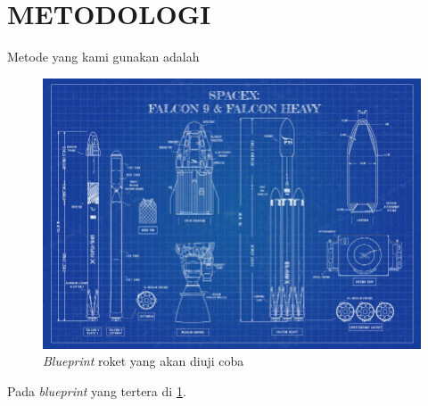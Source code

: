 \section{METODOLOGI}

Metode yang kami gunakan adalah \lipsum[10]

\begin{figure} [ht] \centering
  \includegraphics[scale=0.45]{gambar/blueprint.jpg}
  \caption{\emph{Blueprint} roket yang akan diuji coba}
  \label{fig:Blueprint}
\end{figure}

Pada \emph{blueprint} yang tertera di \ref{fig:Blueprint}. \lipsum[11]

\lipsum[12]